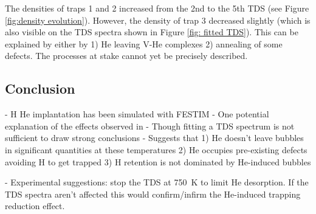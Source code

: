 The densities of traps 1 and 2 increased from the 2nd to the 5th TDS (see Figure \ref{fig:density evolution}).
However, the density of trap 3 decreased slightly (which is also visible on the TDS spectra shown in Figure \ref{fig: fitted TDS}).
This can be explained by either by 1) He leaving V-He complexes 2) annealing of some defects.
The processes at stake cannot yet be precisely described. 

\subsection*{Conclusion}

- H He implantation has been simulated with FESTIM
- One potential explanation of the effects observed in \cite{ialovega_hydrogen_2020}
- Though fitting a TDS spectrum is not sufficient to draw strong conclusions
- Suggests that 1) He doesn't leave bubbles in significant quantities at these temperatures 2) He occupies pre-existing defects avoiding H to get trapped 3) H retention is not dominated by He-induced bubbles

- Experimental suggestions: stop the TDS at \SI{750}{K} to limit He desorption. If the TDS spectra aren't affected this would confirm/infirm the He-induced trapping reduction effect.